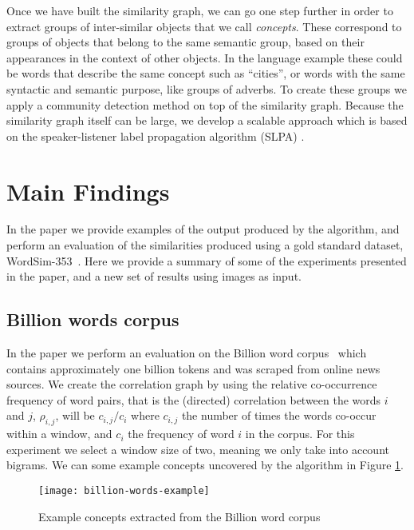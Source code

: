 Once we have built the similarity graph, we can go one step further in order to extract
groups of inter-similar objects that we call \emph{concepts}. These correspond to groups
of objects that belong to the same semantic group, based on their appearances in the context
of other objects. In the language example these could be words that describe the same
concept such as ``cities'', or words with the same syntactic and semantic purpose, like
groups of adverbs. To create these groups we apply a community detection method on top
of the similarity graph. Because the similarity graph itself can be large, we develop
a scalable approach which is based on the speaker-listener label propagation algorithm
(SLPA) \cite{slpa}. 

\section{Main Findings}

\label{sec:concepts-main-findings}

In the paper we provide examples of the output produced by the algorithm, and
perform an evaluation of the similarities produced using a gold standard dataset,
WordSim-353~\cite{wordsim}. Here we provide a summary of some of the experiments
presented in the paper, and a new set of results using images as input.

\subsection{Billion words corpus}

In the paper we perform an evaluation on the Billion word corpus~\cite{billion-word}
which contains approximately one billion tokens and was scraped from online news
sources. We create the correlation graph by using the relative co-occurrence frequency
of word pairs, that is the (directed) correlation between the words $i$ and $j$, $\rho_{i, j}$,
will be $c_{i,j}/c_i$ where $c_{i,j}$ the number of times the words co-occur within
a window, and $c_i$ the frequency of word $i$ in the corpus. For this experiment we
select a window size of two, meaning we only take into account bigrams.
We can some example concepts uncovered by the algorithm in Figure \ref{fig:concepts-billion}.

\begin{figure}
	\centering
	\texttt{[image: billion-words-example]}
	\caption{Example concepts extracted from the Billion word corpus}
	\label{fig:concepts-billion}
\end{figure}

